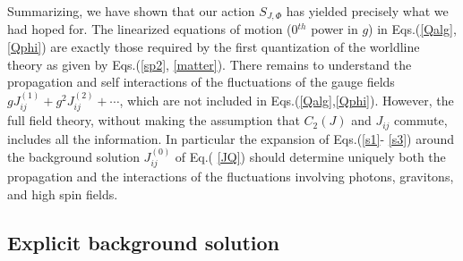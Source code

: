\documentclass[a4paper,12pt]{article}
\begin{document}
Summarizing, we have shown that our action $S_{J,\Phi }$ has yielded
precisely what we had hoped for. The linearized equations of motion (0$^{th}$
power in $g$) in Eqs.(\ref{Qalg},\ref{Qphi}) are exactly those required by
the first quantization of the worldline theory as given by Eqs.(\ref{sp2},%
\ref{matter}). There remains to understand the propagation and self
interactions of the fluctuations of the gauge fields $gJ_{ij}^{\left(
1\right) }+g^{2}J_{ij}^{\left( 2\right) }+\cdots $, which are not included
in Eqs.(\ref{Qalg},\ref{Qphi}). However, the full field theory, without
making the assumption that $C_{2}\left( J\right) $ and $J_{ij}$ commute,
includes all the information. In particular the expansion of Eqs.(\ref{s1}-%
\ref{s3}) around the background solution $J_{ij}^{\left( 0\right) }$ of Eq.(%
\ref{JQ}) should determine uniquely both the propagation and the
interactions of the fluctuations involving photons, gravitons, and high spin
fields.

\subsection{Explicit background solution}
\end{document}
